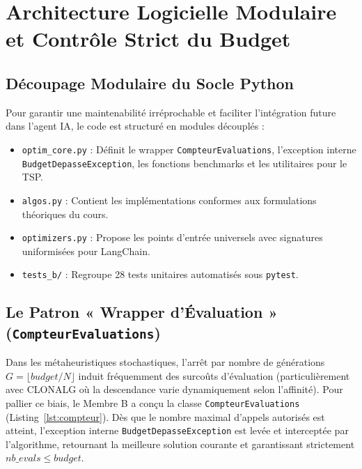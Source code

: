\documentclass[11pt,a4paper]{article}
\begin{document}
\section{Architecture Logicielle Modulaire et Contrôle Strict du Budget}

\subsection{Découpage Modulaire du Socle Python}
Pour garantir une maintenabilité irréprochable et faciliter l'intégration future dans l'agent IA, le code est structuré en modules découplés :
\begin{itemize}\setlength{\itemsep}{0.1em}
    \item \texttt{optim\_core.py} : Définit le wrapper \texttt{CompteurEvaluations}, l'exception interne \texttt{BudgetDepasseException}, les fonctions benchmarks et les utilitaires pour le TSP.
    \item \texttt{algos.py} : Contient les implémentations conformes aux formulations théoriques du cours.
    \item \texttt{optimizers.py} : Propose les points d'entrée universels avec signatures uniformisées pour LangChain.
    \item \texttt{tests\_b/} : Regroupe 28 tests unitaires automatisés sous \texttt{pytest}.
\end{itemize}

\subsection{Le Patron « Wrapper d'Évaluation » (\texttt{CompteurEvaluations})}
Dans les métaheuristiques stochastiques, l'arrêt par nombre de générations $G = \lfloor budget / N \rfloor$ induit fréquemment des surcoûts d'évaluation (particulièrement avec CLONALG où la descendance varie dynamiquement selon l'affinité). Pour pallier ce biais, le Membre B a conçu la classe \texttt{CompteurEvaluations} (Listing~\ref{lst:compteur}). Dès que le nombre maximal d'appels autorisés est atteint, l'exception interne \texttt{BudgetDepasseException} est levée et interceptée par l'algorithme, retournant la meilleure solution courante et garantissant strictement $nb\_evals \le budget$.
\end{document}
